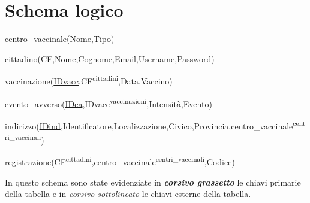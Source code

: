 \section{Schema logico}

	\begin{description}
		\item centro\_vaccinale(\underline{Nome},Tipo)
		
		\item cittadino(\underline{CF},Nome,Cognome,Email,Username,Password)
		
		\item vaccinazione(\underline{IDvacc},CF\textsuperscript{cittadini},Data,Vaccino)
		
		\item evento\_avverso(\underline{IDea},IDvacc\textsuperscript{vaccinazioni},Intensità,Evento)
		
		\item indirizzo(\underline{IDind},Identificatore,Localizzazione,Civico,Provincia,centro\_vaccinale\textsuperscript{centri\_vaccinali})
		
		\item registrazione(\underline{CF\textsuperscript{cittadini}},\underline{centro\_vaccinale\textsuperscript{centri\_vaccinali}},Codice)
	\end{description}
	
	In questo schema sono state evidenziate in \textbf{\textit{corsivo grassetto}} le chiavi primarie della tabella e in \underline{\textit{corsivo sottolineato}} le chiavi esterne della tabella.